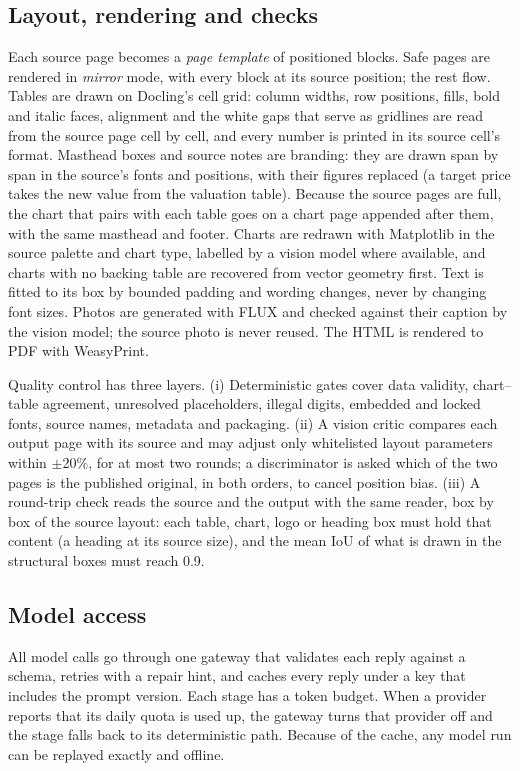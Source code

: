 \documentclass[10pt,twocolumn]{article}
\begin{document}
\subsection{Layout, rendering and checks}
Each source page becomes a \emph{page template} of positioned blocks. Safe pages are rendered in
\emph{mirror} mode, with every block at its source position; the rest flow. Tables are drawn on
Docling's cell grid: column widths, row positions, fills, bold and italic faces, alignment and the
white gaps that serve as gridlines are read from the source page cell by cell, and every number is
printed in its source cell's format. Masthead boxes and source notes are branding: they are drawn
span by span in the source's fonts and positions, with their figures replaced (a target price takes
the new value from the valuation table). Because the source pages are full, the chart that pairs
with each table goes on a chart page appended after them, with the same masthead and footer. Charts are redrawn
with Matplotlib in the source palette and chart type, labelled by a vision model where available,
and charts with no backing table are recovered from vector geometry first. Text is fitted to its
box by bounded padding and wording changes, never by changing font sizes. Photos are generated with
FLUX and checked against their caption by the vision model; the source photo is never reused. The
HTML is rendered to PDF with WeasyPrint.

Quality control has three layers. (i) Deterministic gates cover data validity, chart--table
agreement, unresolved placeholders, illegal digits, embedded and locked fonts, source names,
metadata and packaging. (ii) A vision critic compares each output page with its source and may
adjust only whitelisted layout parameters within $\pm$20\%, for at most two rounds; a
discriminator is asked which of the two pages is the published original, in both orders, to cancel
position bias. (iii) A round-trip check reads the source and the output with the same reader, box by box of the
source layout: each table, chart, logo or heading box must hold that content (a heading at its source
size), and the mean IoU of what is drawn in the structural boxes must reach 0.9.

\subsection{Model access}
All model calls go through one gateway that validates each reply against a schema, retries with a
repair hint, and caches every reply under a key that includes the prompt version. Each stage has a
token budget. When a provider reports that its daily quota is used up, the gateway turns that
provider off and the stage falls back to its deterministic path. Because of the cache, any model
run can be replayed exactly and offline.
\end{document}
